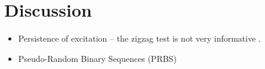 \section{Discussion}
\label{sec:discussion}

\begin{itemize}
    \item Persistence of excitation -- the zigzag test is not very informative \citep{sutulo_algorithm_2014}.
    \item Pseudo-Random Binary Sequences (PRBS) 
\end{itemize}